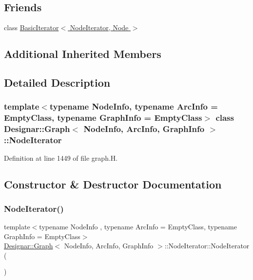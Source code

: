 \subsection*{Friends}
\begin{DoxyCompactItemize}
\item 
class \hyperlink{class_designar_1_1_graph_1_1_node_iterator_a21dc6ae614d097ff896e9e8e422d8f3c}{Basic\+Iterator$<$ Node\+Iterator, Node $>$}
\end{DoxyCompactItemize}
\subsection*{Additional Inherited Members}


\subsection{Detailed Description}
\subsubsection*{template$<$typename Node\+Info, typename Arc\+Info = Empty\+Class, typename Graph\+Info = Empty\+Class$>$\newline
class Designar\+::\+Graph$<$ Node\+Info, Arc\+Info, Graph\+Info $>$\+::\+Node\+Iterator}



Definition at line 1449 of file graph.\+H.



\subsection{Constructor \& Destructor Documentation}
\mbox{\label{class_designar_1_1_graph_1_1_node_iterator_a0449a6ba6cd5d43c04567210a8a064b1}} 
\subsubsection{\texorpdfstring{Node\+Iterator()}{NodeIterator()}\hspace{0.1cm}{\footnotesize\ttfamily [1/5]}}
{\footnotesize\ttfamily template$<$typename Node\+Info , typename Arc\+Info  = Empty\+Class, typename Graph\+Info  = Empty\+Class$>$ \\
\hyperlink{class_designar_1_1_graph}{Designar\+::\+Graph}$<$ Node\+Info, Arc\+Info, Graph\+Info $>$\+::Node\+Iterator\+::\+Node\+Iterator (\begin{DoxyParamCaption}{ }\end{DoxyParamCaption})\hspace{0.3cm}{\ttfamily [inline]}}



